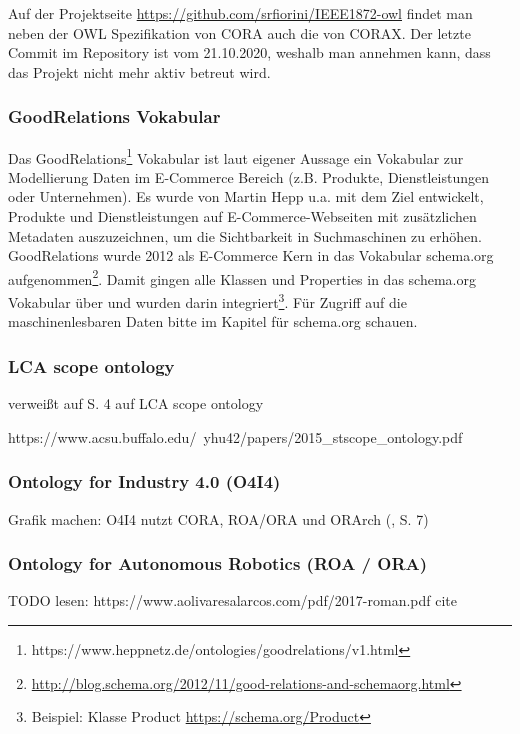 \documentclass{article}
\begin{document}
Auf der Projektseite \url{https://github.com/srfiorini/IEEE1872-owl} findet man neben der OWL Spezifikation von CORA auch die von CORAX. Der letzte Commit im Repository ist vom 21.10.2020, weshalb man annehmen kann, dass das Projekt nicht mehr aktiv betreut wird.

\subsubsection{GoodRelations Vokabular}

Das GoodRelations\footnote{https://www.heppnetz.de/ontologies/goodrelations/v1.html} Vokabular ist laut eigener Aussage ein Vokabular zur Modellierung Daten im E-Commerce Bereich (z.B. Produkte, Dienstleistungen oder Unternehmen).
Es wurde von Martin Hepp u.a. mit dem Ziel entwickelt, Produkte und Dienstleistungen auf E-Commerce-Webseiten mit zusätzlichen Metadaten auszuzeichnen, um die Sichtbarkeit in Suchmaschinen zu erhöhen.
GoodRelations wurde 2012 als E-Commerce Kern in das Vokabular schema.org aufgenommen\footnote{\url{http://blog.schema.org/2012/11/good-relations-and-schemaorg.html}}.
Damit gingen alle Klassen und Properties in das schema.org Vokabular über und wurden darin integriert\footnote{Beispiel: Klasse Product \url{https://schema.org/Product}}.
Für Zugriff auf die maschinenlesbaren Daten bitte im Kapitel für schema.org schauen.

\subsubsection{LCA scope ontology}

\cite{vardem2015anminimal} verweißt auf S. 4 auf LCA scope ontology

https://www.acsu.buffalo.edu/~yhu42/papers/2015\_stscope\_ontology.pdf

\subsubsection{Ontology for Industry 4.0 (O4I4)}

\cite{kumar2019ontologies}

Grafik machen: O4I4 nutzt CORA, ROA/ORA und ORArch (\cite{kumar2019ontologies}, S. 7)

\subsubsection{Ontology for Autonomous Robotics (ROA / ORA)}
TODO lesen: https://www.aolivaresalarcos.com/pdf/2017-roman.pdf
cite \cite{olszewska2017ontology}
\end{document}
